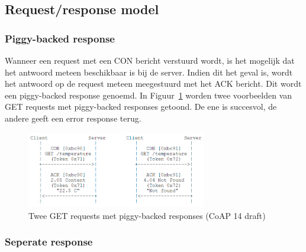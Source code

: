 \subsection{Request/response model}

\subsubsection{Piggy-backed response}

Wanneer een request met een CON bericht verstuurd wordt, is het mogelijk dat het antwoord meteen beschikbaar is bij de server. Indien dit het geval is, wordt het antwoord op de request meteen meegestuurd met het ACK bericht. Dit wordt een piggy-backed response genoemd. In Figuur~\ref{fig:CoAPPiggyBacked} worden twee voorbeelden van GET requests met piggy-backed responses getoond. De ene is succesvol, de andere geeft een error response terug.
\begin{figure}[h]
\vspace{10pt}
\centering
\includegraphics[width=0.7\textwidth]{fig/CoAPPiggyBacked}
\caption{Twee GET requests met piggy-backed responses (CoAP 14 draft)}
\label{fig:CoAPPiggyBacked}
\vspace{-20pt}
\end{figure}

\newpage

\subsubsection{Seperate response}

